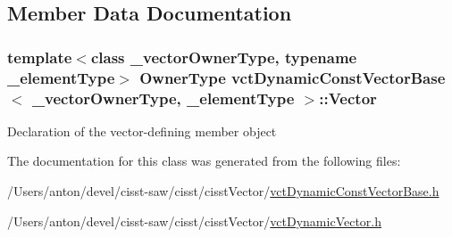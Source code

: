\subsection{Member Data Documentation}
\hypertarget{classvct_dynamic_const_vector_base_a3cec7518a9b77eb391a9d19220e4b892}{}
\subsubsection[{Vector}]{\setlength{\rightskip}{0pt plus 5cm}template$<$class \+\_\+vector\+Owner\+Type, typename \+\_\+element\+Type$>$ {\bf Owner\+Type} {\bf vct\+Dynamic\+Const\+Vector\+Base}$<$ \+\_\+vector\+Owner\+Type, \+\_\+element\+Type $>$\+::Vector\hspace{0.3cm}{\ttfamily [protected]}}\label{classvct_dynamic_const_vector_base_a3cec7518a9b77eb391a9d19220e4b892}
Declaration of the vector-\/defining member object 

The documentation for this class was generated from the following files\+:\begin{DoxyCompactItemize}
\item 
/\+Users/anton/devel/cisst-\/saw/cisst/cisst\+Vector/\hyperlink{vct_dynamic_const_vector_base_8h}{vct\+Dynamic\+Const\+Vector\+Base.\+h}\item 
/\+Users/anton/devel/cisst-\/saw/cisst/cisst\+Vector/\hyperlink{vct_dynamic_vector_8h}{vct\+Dynamic\+Vector.\+h}\end{DoxyCompactItemize}
